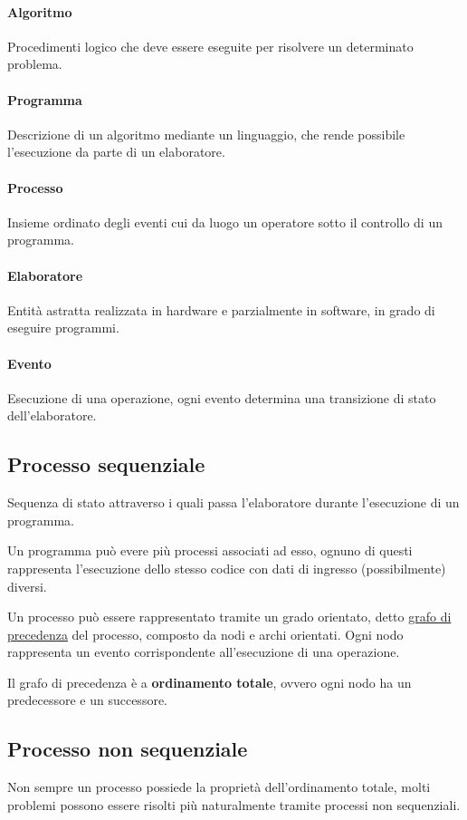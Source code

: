 \paragraph{Algoritmo} Procedimenti logico che deve essere eseguite per risolvere un determinato problema.

\paragraph{Programma} Descrizione di un algoritmo mediante un linguaggio, che rende possibile l'esecuzione da parte di un elaboratore.

\paragraph{Processo} Insieme ordinato degli eventi cui da luogo un operatore sotto il controllo di un programma.

\paragraph{Elaboratore} Entità astratta realizzata in hardware e parzialmente in software, in grado di eseguire programmi.

\paragraph{Evento} Esecuzione di una operazione, ogni evento determina una transizione di stato dell'elaboratore.

\subsection{Processo sequenziale}
Sequenza di stato attraverso i quali passa l'elaboratore durante l'esecuzione di un programma.

Un programma può evere più processi associati ad esso, ognuno di questi rappresenta l'esecuzione dello stesso codice con dati di ingresso (possibilmente) diversi.

Un processo può essere rappresentato tramite un grado orientato, detto \underline{grafo di precedenza} del processo, composto da nodi e archi orientati.
Ogni nodo rappresenta un evento corrispondente all'esecuzione di una operazione.

Il grafo di precedenza è a \textbf{ordinamento totale}, ovvero ogni nodo ha un predecessore e un successore.

\subsection{Processo non sequenziale}
Non sempre un processo possiede la proprietà dell'ordinamento totale, molti problemi possono essere risolti più naturalmente tramite processi non sequenziali.

